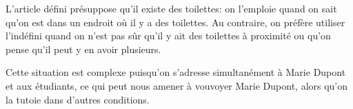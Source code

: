 {     L’article défini présuppose qu’il existe des toilettes: on l’emploie quand on sait qu’on est dans un endroit où il y a des toilettes. Au contraire, on préfère utiliser l’indéfini quand on n’est pas sûr qu’il y ait des toilettes à proximité ou qu’on pense qu’il peut y en avoir plusieurs.

     Cette situation est complexe puisqu’on s’adresse simultanément à Marie Dupont et aux étudiants, ce qui peut nous amener à vouvoyer Marie Dupont, alors qu’on la tutoie dans d’autres conditions.
}
